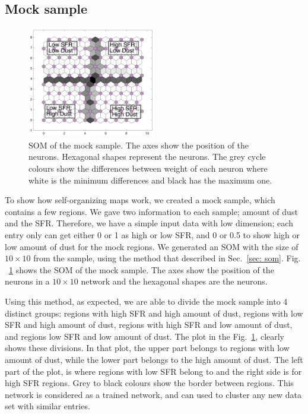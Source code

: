     
\subsection{Mock sample}
\label{sec: mock_sample}
 
         \begin{figure}
                \centering
                \includegraphics[width=0.5\textwidth]{../images0.01/mock_sample.png}
            \caption{SOM of the mock sample. The axes show the position of the neurons. Hexagonal shapes represent the neurons. The grey cycle colours show the differences between weight of each neuron where white is the minimum differences and black has the maximum one.}
            \label{fig: sample}
        \end{figure}
 
To show how self-organizing maps work, we created a mock sample, which contains a few regions.
We gave two information to each sample; amount of dust and the SFR.
 Therefore, we have a simple input data with low dimension; each entry only can get either 0 or 1 as high or low SFR, and 0 or 0.5 to show high or low amount of dust for the mock regions.
 We generated an SOM with the size of $10 \times 10$ from the sample, using the method that described in Sec.~\ref{sec: som}.
 Fig. ~\ref{fig: sample} shows the SOM of the mock sample. 
 The axes show the position of the neurons in a $10 \times 10$ network and the hexagonal shapes are the neurons.
 
Using this method, as expected, we are able to divide the mock sample into 4 distinct groups: regions with high SFR and high amount of dust, regions with low SFR and high amount of dust, regions with high SFR and low amount of dust, and regions low SFR and low amount of dust. 
The plot in the Fig.~\ref{fig: sample}, clearly shows these divisions.
In that plot, the upper part belongs to regions with low amount of dust, while the lower part belongs to the high amount of dust.
The left part of the plot, is where regions with low SFR belong to and the right side is for high SFR regions.
Grey to black colours show the border between regions.
This network is considered as a trained network, and can used to cluster any new data set with similar entries.

